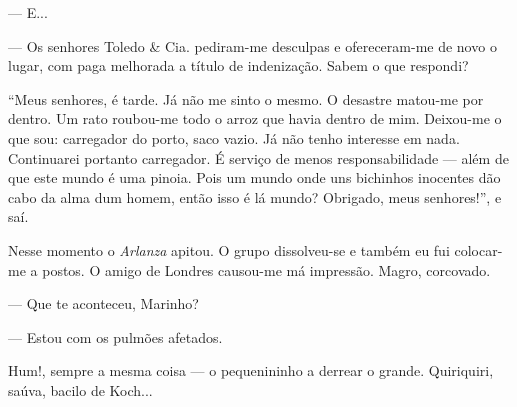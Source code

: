 --- E...

--- Os senhores Toledo \& Cia. pediram-me desculpas e ofereceram-me de
novo o lugar, com paga melhorada a título de indenização. Sabem o que
respondi?

``Meus senhores, é tarde. Já não me sinto o mesmo. O desastre matou-me
por dentro. Um rato roubou-me todo o arroz que havia dentro de mim.
Deixou-me o que sou: carregador do porto, saco vazio. Já não tenho
interesse em nada. Continuarei portanto carregador. É serviço de menos
responsabilidade --- além de que este mundo é uma pinoia. Pois um mundo
onde uns bichinhos inocentes dão cabo da alma dum homem, então isso é lá
mundo? Obrigado, meus senhores!'', e saí.

Nesse momento o \emph{Arlanza} apitou. O grupo dissolveu-se e também eu
fui colocar-me a postos. O amigo de Londres causou-me má impressão.
Magro, corcovado.

--- Que te aconteceu, Marinho?

--- Estou com os pulmões afetados.

Hum!, sempre a mesma coisa --- o pequenininho a derrear o grande.
Quiriquiri, saúva, bacilo de Koch...


